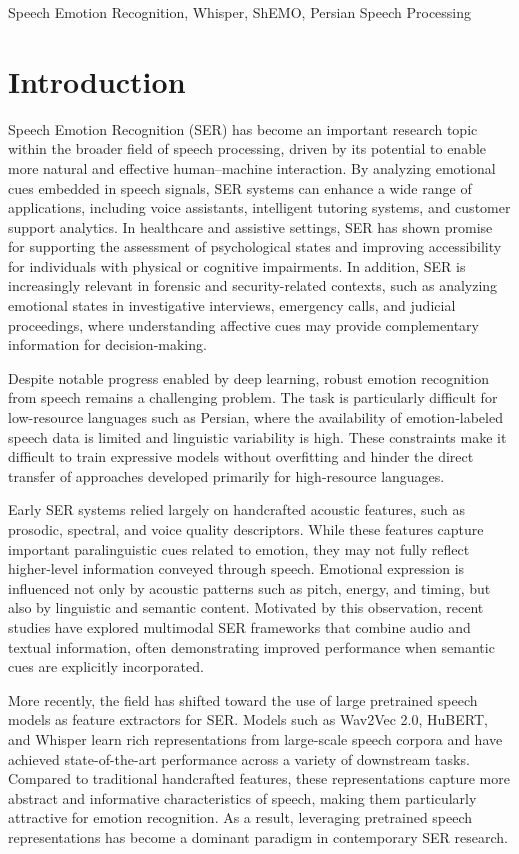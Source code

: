 \documentclass[conference]{IEEEtran}
\begin{document}
\begin{IEEEkeywords}
Speech Emotion Recognition, Whisper, ShEMO, Persian Speech Processing
\end{IEEEkeywords}

\section{Introduction}
Speech Emotion Recognition (SER) has become an important research topic within the broader field of speech processing, driven by its potential to enable more natural and effective human–machine interaction. By analyzing emotional cues embedded in speech signals, SER systems can enhance a wide range of applications, including voice assistants, intelligent tutoring systems, and customer support analytics. In healthcare and assistive settings, SER has shown promise for supporting the assessment of psychological states and improving accessibility for individuals with physical or cognitive impairments. In addition, SER is increasingly relevant in forensic and security-related contexts, such as analyzing emotional states in investigative interviews, emergency calls, and judicial proceedings, where understanding affective cues may provide complementary information for decision-making.

Despite notable progress enabled by deep learning, robust emotion recognition from speech remains a challenging problem. The task is particularly difficult for low-resource languages such as Persian, where the availability of emotion-labeled speech data is limited and linguistic variability is high. These constraints make it difficult to train expressive models without overfitting and hinder the direct transfer of approaches developed primarily for high-resource languages.

Early SER systems relied largely on handcrafted acoustic features, such as prosodic, spectral, and voice quality descriptors. While these features capture important paralinguistic cues related to emotion, they may not fully reflect higher-level information conveyed through speech. Emotional expression is influenced not only by acoustic patterns such as pitch, energy, and timing, but also by linguistic and semantic content. Motivated by this observation, recent studies have explored multimodal SER frameworks that combine audio and textual information, often demonstrating improved performance when semantic cues are explicitly incorporated.

More recently, the field has shifted toward the use of large pretrained speech models as feature extractors for SER. Models such as Wav2Vec 2.0, HuBERT, and Whisper learn rich representations from large-scale speech corpora and have achieved state-of-the-art performance across a variety of downstream tasks. Compared to traditional handcrafted features, these representations capture more abstract and informative characteristics of speech, making them particularly attractive for emotion recognition. As a result, leveraging pretrained speech representations has become a dominant paradigm in contemporary SER research.
\end{document}
